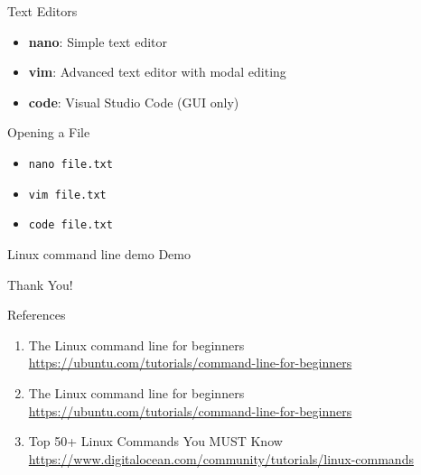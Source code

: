 \documentclass{beamer}
\begin{document}
\begin{frame}{Text Editors}
  \begin{itemize}
    \item \textbf{nano}: Simple text editor
    \item \textbf{vim}: Advanced text editor with modal editing
    \item \textbf{code}: Visual Studio Code (GUI only)
  \end{itemize}
  \begin{exampleblock}{Opening a File}
    \begin{itemize}
      \item \texttt{nano file.txt}
      \item \texttt{vim file.txt}
      \item \texttt{code file.txt}
    \end{itemize}
  \end{exampleblock}
\end{frame}

\begin{frame}{Linux command line demo}
  Demo
\end{frame}

\begin{frame}
    \centering
    \Huge{Thank You!}
\end{frame}

\begin{frame}{References}
  \begin{enumerate}
    \item The Linux command line for beginners \href{https://ubuntu.com/tutorials/command-line-for-beginners}{https://ubuntu.com/tutorials/command-line-for-beginners}
    \item The Linux command line for beginners \href{https://ubuntu.com/tutorials/command-line-for-beginners}{https://ubuntu.com/tutorials/command-line-for-beginners}
    \item Top 50+ Linux Commands You MUST Know \href{https://www.digitalocean.com/community/tutorials/linux-commands}{https://www.digitalocean.com/community/tutorials/linux-commands}
  \end{enumerate}
\end{frame}
\end{document}
